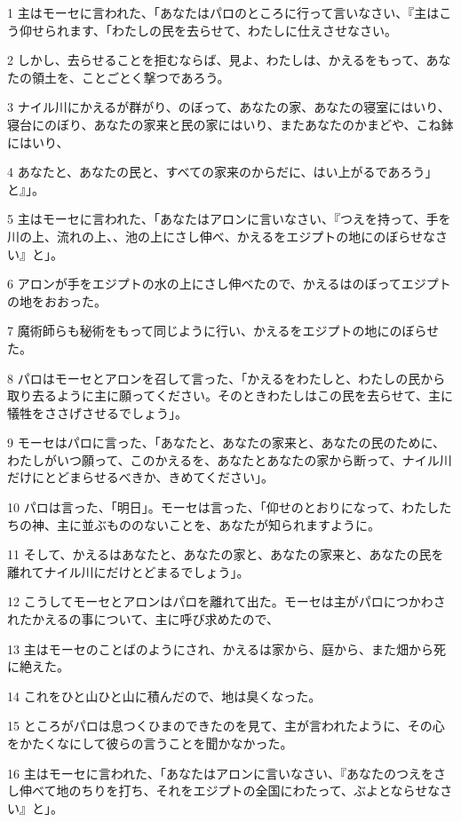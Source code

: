 \par 1 主はモーセに言われた、「あなたはパロのところに行って言いなさい、『主はこう仰せられます、「わたしの民を去らせて、わたしに仕えさせなさい。
\par 2 しかし、去らせることを拒むならば、見よ、わたしは、かえるをもって、あなたの領土を、ことごとく撃つであろう。
\par 3 ナイル川にかえるが群がり、のぼって、あなたの家、あなたの寝室にはいり、寝台にのぼり、あなたの家来と民の家にはいり、またあなたのかまどや、こね鉢にはいり、
\par 4 あなたと、あなたの民と、すべての家来のからだに、はい上がるであろう」と』」。
\par 5 主はモーセに言われた、「あなたはアロンに言いなさい、『つえを持って、手を川の上、流れの上、、池の上にさし伸べ、かえるをエジプトの地にのぼらせなさい』と」。
\par 6 アロンが手をエジプトの水の上にさし伸べたので、かえるはのぼってエジプトの地をおおった。
\par 7 魔術師らも秘術をもって同じように行い、かえるをエジプトの地にのぼらせた。
\par 8 パロはモーセとアロンを召して言った、「かえるをわたしと、わたしの民から取り去るように主に願ってください。そのときわたしはこの民を去らせて、主に犠牲をささげさせるでしょう」。
\par 9 モーセはパロに言った、「あなたと、あなたの家来と、あなたの民のために、わたしがいつ願って、このかえるを、あなたとあなたの家から断って、ナイル川だけにとどまらせるべきか、きめてください」。
\par 10 パロは言った、「明日」。モーセは言った、「仰せのとおりになって、わたしたちの神、主に並ぶもののないことを、あなたが知られますように。
\par 11 そして、かえるはあなたと、あなたの家と、あなたの家来と、あなたの民を離れてナイル川にだけとどまるでしょう」。
\par 12 こうしてモーセとアロンはパロを離れて出た。モーセは主がパロにつかわされたかえるの事について、主に呼び求めたので、
\par 13 主はモーセのことばのようにされ、かえるは家から、庭から、また畑から死に絶えた。
\par 14 これをひと山ひと山に積んだので、地は臭くなった。
\par 15 ところがパロは息つくひまのできたのを見て、主が言われたように、その心をかたくなにして彼らの言うことを聞かなかった。
\par 16 主はモーセに言われた、「あなたはアロンに言いなさい、『あなたのつえをさし伸べて地のちりを打ち、それをエジプトの全国にわたって、ぶよとならせなさい』と」。
